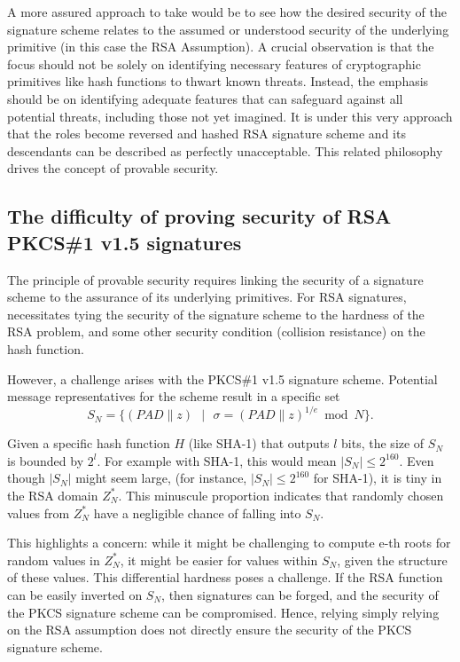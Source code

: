 \documentclass[]{final_report}
\theoremstyle{definition}
\begin{document}
A more assured approach to take would be to see how the desired security of the signature scheme relates to the assumed or understood security of the underlying primitive (in this case the RSA Assumption). A crucial observation is that the focus should not be solely on identifying necessary features of cryptographic primitives like hash functions to thwart known threats. Instead, the emphasis should be on identifying adequate features that can safeguard against all potential threats, including those not yet imagined. It is under this very approach that the roles become reversed and hashed RSA signature scheme and its descendants can be described as perfectly unacceptable. This related philosophy drives the concept of provable security.

\subsection{The difficulty of proving security of RSA PKCS\#1 v1.5 signatures}

The principle of provable security requires linking the security of a signature scheme to the assurance of its underlying primitives. For RSA signatures, necessitates tying the security of the signature scheme to the hardness of the RSA problem, and some other security condition (collision resistance) on the hash function.

However, a challenge arises with the PKCS\#1 v1.5 signature scheme. Potential message representatives for the scheme result in a specific set
\[ S_N = \{ (PAD \| z) \text{ } | \text{ } \sigma = (PAD \| z)^{1/e} \bmod N \}. \] 

Given a specific hash function $H$ (like SHA-1) that outputs $l$ bits, the size of $S_N$ is bounded by $2^l$. For example with SHA-1, this would mean  $|S_N| \leq 2^{160}.$ Even though $|S_N|$ might seem large, (for instance, \( |S_N| \leq 2^{160} \) for SHA-1), it is tiny in the RSA domain \( Z_N^* \). This minuscule proportion indicates that randomly chosen values from \( Z_N^* \) have a negligible chance of falling into \( S_N \).

This highlights a concern: while it might be challenging to compute e-th roots for random values in $Z_N^*$, it might be easier for values within $S_N$, given the structure of these values. This differential hardness poses a challenge. If the RSA function can be easily inverted on  $S_N$, then signatures can be forged, and the security of the PKCS signature scheme can be compromised. Hence, relying simply relying on the RSA assumption does not directly ensure the security of the PKCS signature scheme. 
\end{document}
